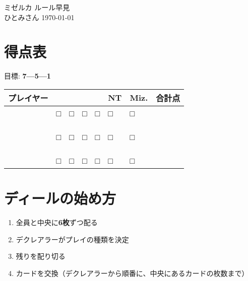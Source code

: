 \documentclass[jafontsize=12pt]{jlreq}
\begin{document}
\pagestyle{empty}

\begin{center}
{\LARGE ミゼルカ ルール早見}\\ひとみさん \today
\end{center}

\setlength{\parindent}{0pt}
\section{得点表}
{\LARGE\rule{0pt}{0pt}\hfill 目標: \textbf{7---5---1}\hfill\rule{0pt}{0pt}}
\begin{table}[h]
	\centering\Large
	\begin{tabular}{|c||p{1.8cm}|p{1.8cm}|p{1.8cm}|p{1.8cm}|p{1.8cm}|p{1.8cm}|c|}
		\hline
		プレイヤー&{\hfil\hmS\hfil}&{\hfil\hmH\hfil}&{\hfil\hmD\hfil}&{\hfil\hmC\hfil}&{\hfil{\hmtcfont NT}\hfil}&{\hfil{\hmtcfont Miz.}\hfil}&合計点\\
		\hline\hline
		&□&□&□&□&□&□&\\\cline{2-7}
		&&&&&&&\\\cline{2-7}
		&&&&&&&\\\cline{2-7}
		\hline\hline
		&&&&&&&\\\cline{2-7}
		&□&□&□&□&□&□&\\\cline{2-7}
		&&&&&&&\\\cline{2-7}
		\hline\hline
		&&&&&&&\\\cline{2-7}
		&&&&&&&\\\cline{2-7}
		&□&□&□&□&□&□&\\\cline{2-7}
		\hline
	\end{tabular}
\end{table}

\section{ディールの始め方}
\begin{enumerate}
	\item 全員と中央に\textbf{6枚}ずつ配る
	\item デクレアラーがプレイの種類を決定
	\item 残りを配り切る
	\item カードを交換（デクレアラーから順番に、中央にあるカードの枚数まで）
\end{enumerate}

\end{document}
